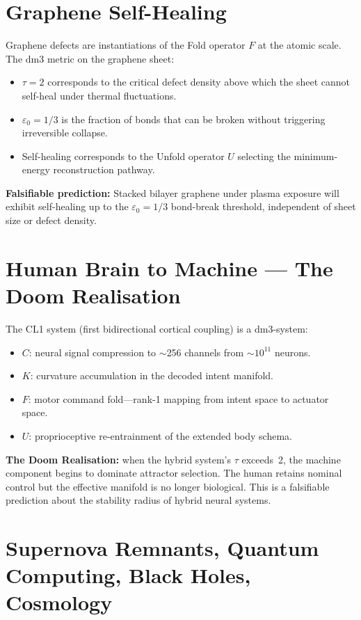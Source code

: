 \documentclass[11pt, twoside, openright]{book}
\theoremstyle{plain}
\theoremstyle{definition}
\newcommand{\eps}{\varepsilon_0}
\begin{document}
\chapter{Graphene Self-Healing}

Graphene defects are instantiations of the Fold operator $F$ at the
atomic scale. The dm3 metric on the graphene sheet:
\begin{itemize}[leftmargin=*]
  \item $\tau = 2$ corresponds to the critical defect density above
    which the sheet cannot self-heal under thermal fluctuations.
  \item $\eps = 1/3$ is the fraction of bonds that can be broken without
    triggering irreversible collapse.
  \item Self-healing corresponds to the Unfold operator $U$ selecting
    the minimum-energy reconstruction pathway.
\end{itemize}

\textbf{Falsifiable prediction:} Stacked bilayer graphene under plasma
exposure will exhibit self-healing up to the $\eps = 1/3$ bond-break
threshold, independent of sheet size or defect density.

\chapter{Human Brain to Machine --- The Doom Realisation}

The CL1 system (first bidirectional cortical coupling) is a dm3-system:
\begin{itemize}[leftmargin=*]
  \item $C$: neural signal compression to $\sim$256 channels from
    $\sim$$10^{11}$ neurons.
  \item $K$: curvature accumulation in the decoded intent manifold.
  \item $F$: motor command fold---rank-1 mapping from intent space to
    actuator space.
  \item $U$: proprioceptive re-entrainment of the extended body schema.
\end{itemize}

\textbf{The Doom Realisation:} when the hybrid system's $\tau$ exceeds~2,
the machine component begins to dominate attractor selection. The human
retains nominal control but the effective manifold is no longer
biological. This is a falsifiable prediction about the stability radius
of hybrid neural systems.

\chapter{Supernova Remnants, Quantum Computing, Black Holes, Cosmology}
\end{document}
